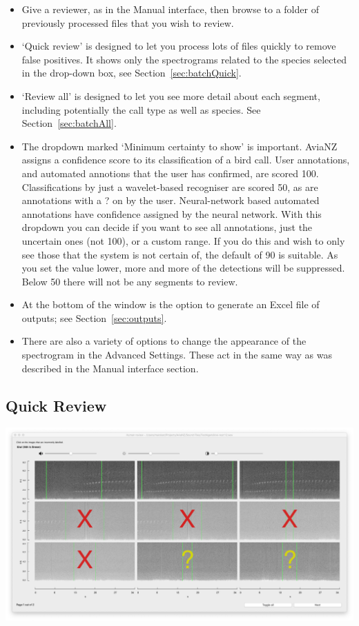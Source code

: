 \documentclass{article}
\begin{document}
\begin{itemize}
\item Give a reviewer, as in the Manual interface, then browse to a folder of previously processed files that you wish to review.
\item `Quick review' is designed to let you process lots of files quickly to remove false positives. It shows only the spectrograms related to the species selected in the drop-down box, see Section~\ref{sec:batchQuick}.
\item `Review all' is designed to let you see more detail about each segment, including potentially the call type as well as species. See Section~\ref{sec:batchAll}.
\item The dropdown marked `Minimum certainty to show' is important. AviaNZ assigns a confidence score to its classification of a bird call. User annotations, and automated annotions that the user has confirmed, are scored 100. Classifications by just a wavelet-based recogniser are scored 50, as are annotations with a ? on by the user. Neural-network based automated annotations have confidence assigned by the neural network. With this dropdown you can decide if you want to see all annotations, just the uncertain ones (not 100), or a custom range. If you do this and wish to only see those that the system is not certain of, the default of 90 is suitable. As you set the value lower, more and more of the detections will be suppressed. Below 50 there will not be any segments to review.
\item At the bottom of the window is the option to generate an Excel file of outputs; see Section~\ref{sec:outputs}.
\item There are also a variety of options to change the appearance of the spectrogram in the Advanced Settings. These act in the same way as was described in the Manual interface section.
\end{itemize}

\subsection{Quick Review\label{sec:batchQuick}}

\begin{center}
	\includegraphics[width=.9\textwidth]{Figures/BatchReview2}
\end{center}
\end{document}
